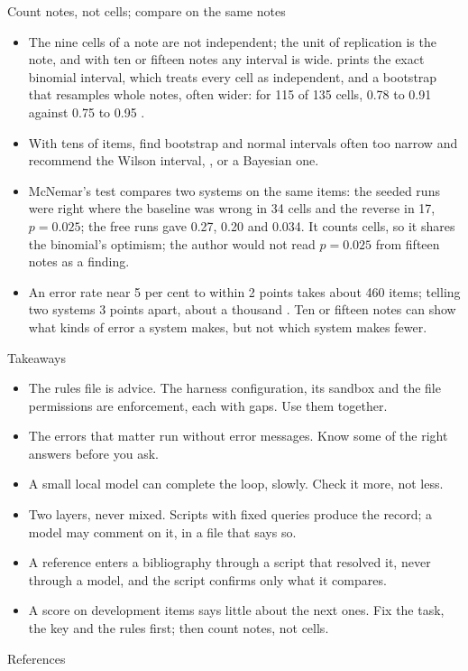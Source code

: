 \documentclass[11pt,aspectratio=169]{beamer}
\begin{document}
\begin{frame}{Count notes, not cells; compare on the same notes}
  \small
  \begin{itemize}
    \item The nine cells of a note are not independent; the unit of replication is the note, and with ten or fifteen notes any interval is wide.  prints the exact binomial interval, which treats every cell as independent, and a bootstrap that resamples whole notes, often wider: for 115 of 135 cells, 0.78 to 0.91 against 0.75 to 0.95 \parencite{miller2024errorbars}.
    \item With tens of items, \textcite{bowyer2025clt} find bootstrap and normal intervals often too narrow and recommend the Wilson interval, , or a Bayesian one.
    \item McNemar's test compares two systems on the same items: the seeded runs were right where the baseline was wrong in 34 cells and the reverse in 17, $p = 0.025$; the free runs gave 0.27, 0.20 and 0.034. It counts cells, so it shares the binomial's optimism; the author would not read $p = 0.025$ from fifteen notes as a finding.
    \item An error rate near 5 per cent to within 2 points takes about 460 items; telling two systems 3 points apart, about a thousand \parencite{miller2024errorbars}. Ten or fifteen notes can show what kinds of error a system makes, but not which system makes fewer.
  \end{itemize}
\end{frame}

\begin{frame}{Takeaways}
  \begin{itemize}
    \item The rules file is advice. The harness configuration, its sandbox and the file permissions are enforcement, each with gaps. Use them together.
    \item The errors that matter run without error messages. Know some of the right answers before you ask.
    \item A small local model can complete the loop, slowly. Check it more, not less.
    \item Two layers, never mixed. Scripts with fixed queries produce the record; a model may comment on it, in a file that says so.
    \item A reference enters a bibliography through a script that resolved it, never through a model, and the script confirms only what it compares.
    \item A score on development items says little about the next ones. Fix the task, the key and the rules first; then count notes, not cells.
  \end{itemize}
\end{frame}

\begin{frame}[allowframebreaks]{References}
  \printbibliography[heading=none]
\end{frame}
\end{document}
